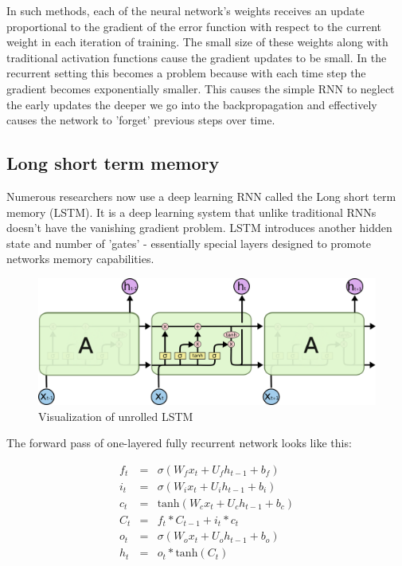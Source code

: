 In such methods, each of the neural network's weights receives an update proportional to the gradient of the error function with respect to the current weight in each iteration of training. The small size of these weights along with traditional activation functions cause the gradient updates to be small. In the recurrent setting this becomes a problem because with each time step the gradient becomes exponentially smaller. This causes the simple RNN to neglect the early updates the deeper we go into the backpropagation and effectively causes the network to 'forget' previous steps over time.

\subsection{Long short term memory} Numerous researchers now use a deep learning RNN called the Long short term memory (LSTM)\cite{cite:LSTM}. It is a deep learning system that unlike traditional RNNs doesn't have the vanishing gradient problem. LSTM introduces another hidden state and number of 'gates' - essentially special layers designed to promote networks memory capabilities.
\begin{figure}
\includegraphics[width=\textwidth]{images/supervised/lstm.png}
\caption{Visualization of unrolled LSTM\protect\footnotemark}
\label{fig:lstm}
\end{figure}


The forward pass of one-layered fully recurrent network looks like this:

\begin{equation}
\begin{array}{lcl} 
f_t &=& \sigma \left(W_fx_t+U_fh_{t-1}+b_f\right)
\\
i_t &=& \sigma \left(W_ix_t+U_ih_{t-1}+b_i\right)
\\
c_t &=& \text{tanh} \left(W_cx_t+U_ch_{t-1}+b_c\right)
\\
C_t &=& f_t * C_{t-1} + i_t * c_t
\\
o_t &=& \sigma \left(W_ox_t+U_oh_{t-1}+b_o\right)
\\
h_t &=& o_t * \text{tanh}(C_t)
 \end{array}
\end{equation}

